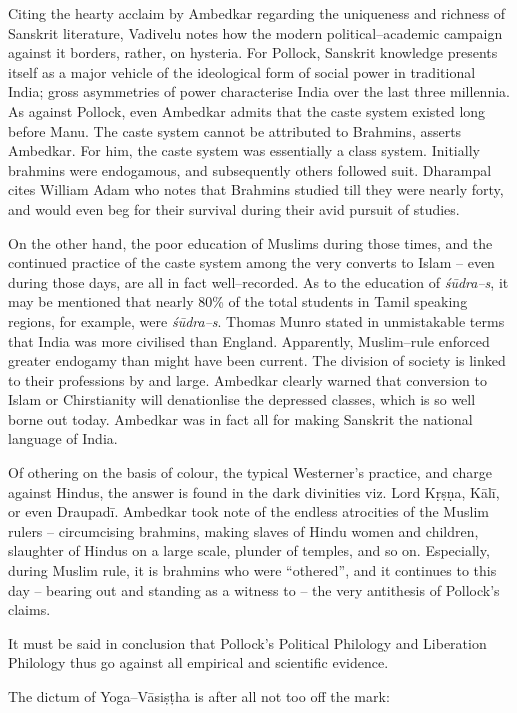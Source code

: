 Citing the hearty acclaim by Ambedkar regarding the uniqueness and richness of Sanskrit literature, Vadivelu notes how the modern political–academic campaign against it borders, rather, on hysteria. For Pollock, Sanskrit knowledge presents itself as a major vehicle of the ideological form of social power in traditional India; gross asymmetries of power characterise India over the last three millennia. As against Pollock, even Ambedkar admits that the caste system existed long before Manu. The caste system cannot be attributed to Brahmins, asserts Ambedkar. For him, the caste system was essentially a class system. Initially brahmins were endogamous, and subsequently others followed suit. Dharampal cites William Adam who notes that Brahmins studied till they were nearly forty, and would even beg for their survival during their avid pursuit of studies.

On the other hand, the poor education of Muslims during those times, and the continued practice of the caste system among the very converts to Islam – even during those days, are all in fact well–recorded. As to the education of \textit{śūdra–s}, it may be mentioned that nearly 80\% of the total students in Tamil speaking regions, for example, were \textit{śūdra–s}. Thomas Munro stated in unmistakable terms that India was more civilised than England. Apparently, Muslim–rule enforced greater endogamy than might have been current. The division of society is linked to their professions by and large. Ambedkar clearly warned that conversion to Islam or Chirstianity will denationlise the depressed classes, which is so well borne out today. Ambedkar was in fact all for making Sanskrit the national language of India.

Of othering on the basis of colour, the typical Westerner’s practice, and charge against Hindus, the answer is found in the dark divinities viz. Lord Kṛṣṇa, Kālī, or even Draupadī. Ambedkar took note of the endless atrocities of the Muslim rulers – circumcising brahmins, making slaves of Hindu women and children, slaughter of Hindus on a large scale, plunder of temples, and so on. Especially, during Muslim rule, it is brahmins who were “othered”, and it continues to this day – bearing out and standing as a witness to – the very antithesis of Pollock’s claims.

It must be said in conclusion that Pollock’s Political Philology and Liberation Philology thus go against all empirical and scientific evidence.

The dictum of Yoga–Vāsiṣṭha is after all not too off the mark:

